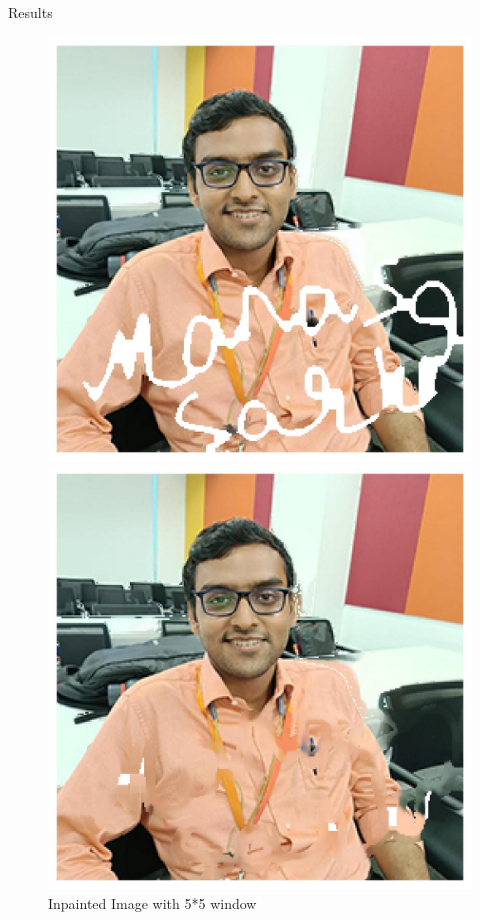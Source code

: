 \documentclass{beamer}
\begin{document}
\begin{frame}{Results}
    \begin{figure}[h]
    \centering
    \begin{minipage}{0.32\textwidth}
        \centering
        \includegraphics[width=\linewidth]{Image_inpainted_ts.jpg} %
        \caption{Inpainted Image with 5*5 window}
    \end{minipage}
    \hfill
    \begin{minipage}{0.32\textwidth}
        \centering
        \includegraphics[width=\linewidth]{Image_inpainted_ts_13.jpg} %

\end{minipage}
\end{figure}
\end{frame}
\end{document}
